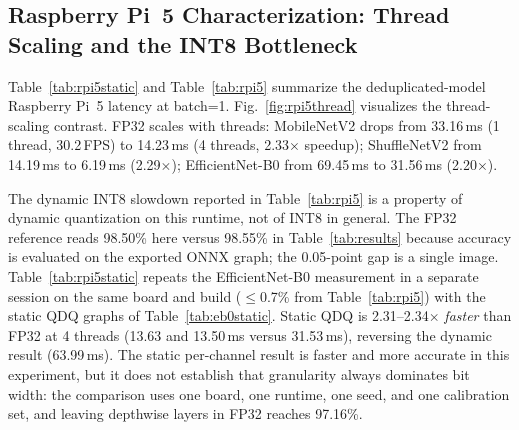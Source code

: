 \documentclass[conference,a4paper]{IEEEtran}
\begin{document}
\subsection{Raspberry Pi~5 Characterization: Thread Scaling and the INT8 Bottleneck}
Table~\ref{tab:rpi5static} and Table~\ref{tab:rpi5} summarize the deduplicated-model Raspberry Pi~5 latency at batch=1. Fig.~\ref{fig:rpi5thread} visualizes the thread-scaling contrast. FP32 scales with threads: MobileNetV2 drops from 33.16\,ms (1 thread, 30.2\,FPS) to 14.23\,ms (4 threads, 2.33$\times$ speedup); ShuffleNetV2 from 14.19\,ms to 6.19\,ms (2.29$\times$); EfficientNet-B0 from 69.45\,ms to 31.56\,ms (2.20$\times$).

The dynamic INT8 slowdown reported in Table~\ref{tab:rpi5} is a property of dynamic quantization on this runtime, not of INT8 in general. The FP32 reference reads 98.50\% here versus 98.55\% in Table~\ref{tab:results} because accuracy is evaluated on the exported ONNX graph; the 0.05-point gap is a single image. Table~\ref{tab:rpi5static} repeats the EfficientNet-B0 measurement in a separate session on the same board and build (\mbox{$\le$}0.7\% from Table~\ref{tab:rpi5}) with the static QDQ graphs of Table~\ref{tab:eb0static}. Static QDQ is 2.31--2.34$\times$ \emph{faster} than FP32 at 4 threads (13.63 and 13.50\,ms versus 31.53\,ms), reversing the dynamic result (63.99\,ms). The static per-channel result is faster and more accurate in this experiment, but it does not establish that granularity always dominates bit width: the comparison uses one board, one runtime, one seed, and one calibration set, and leaving depthwise layers in FP32 reaches 97.16\%.

\begin{table}[htbp]
\caption{EfficientNet-B0 on Raspberry Pi~5, batch=1, mean of 200 runs after 10 warmup, CPUExecutionProvider only, ORT 1.29.0. Accuracy on exported ONNX graphs.}
\label{tab:rpi5static}
\centering
\footnotesize
\setlength{\tabcolsep}{4pt}
\end{table}
\end{document}
